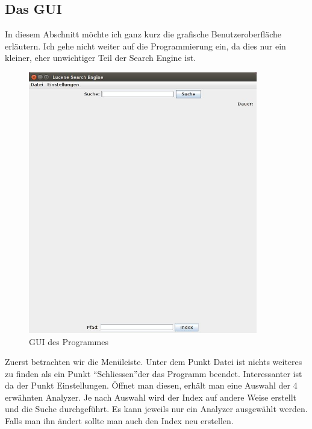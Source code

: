 \documentclass[12pt,a4paper,ngerman]{report}
\begin{document}
\subsection{Das GUI}
In diesem Abschnitt möchte ich ganz kurz die grafische Benutzeroberfläche erläutern. Ich gehe nicht weiter auf die Programmierung ein, da dies nur ein kleiner, eher unwichtiger Teil der Search Engine ist.
\begin{figure}[h!]
\centering
\includegraphics[width=10cm]{img/Lucene_Search_Engine_1.jpg}
\caption{GUI des Programmes\protect\footnotemark}
\end{figure}
Zuerst betrachten wir die Menüleiste. Unter dem Punkt Datei ist nichts weiteres zu finden als ein Punkt \textquotedblleft Schliessen\textquotedblright der das Programm beendet. Interessanter ist da der Punkt Einstellungen. Öffnet man diesen, erhält man eine Auswahl der 4 erwähnten Analyzer. Je nach Auswahl wird der Index auf andere Weise erstellt und die Suche durchgeführt. Es kann jeweils nur ein Analyzer ausgewählt werden. Falls man ihn ändert sollte man auch den Index neu erstellen.
\end{document}
